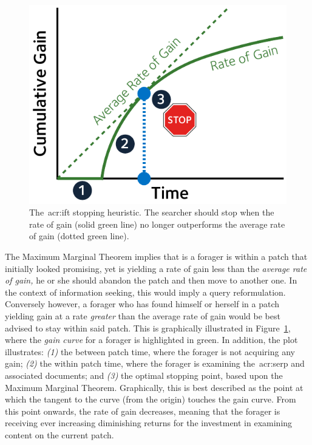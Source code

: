 \begin{figure}
    \begin{center}
    \vspace*{-10mm}
    \includegraphics[width=1\textwidth]{figures/ch3-ift_stop.pdf}
    \end{center}
    \vspace*{-4mm}
    \caption[\gls{acr:ift} Stopping Heuristic]{The~\gls{acr:ift} stopping heuristic. The searcher should stop when the rate of gain (solid {\color{dmax_green}green} line) no longer outperforms the average rate of gain (dotted {\color{dmax_green}green} line).}
    \label{fig:ift_stopping}
\end{figure}

The Maximum Marginal Theorem implies that is a forager is within a patch that initially looked promising, yet is yielding a rate of gain less than the \emph{average rate of gain,} he or she should abandon the patch and then move to another one. In the context of information seeking, this would imply a query reformulation. Conversely however, a forager who has found himself or herself in a patch yielding gain at a rate \emph{greater} than the average rate of gain would be best advised to stay within said patch. This is graphically illustrated in Figure~\ref{fig:ift_stopping}, where the \emph{gain curve} for a forager is highlighted in {\color{dmax_green}green.} In addition, the plot illustrates: \emph{(1)} the between patch time, where the forager is not acquiring any gain; \emph{(2)} the within patch time, where the forager is examining the~\gls{acr:serp} and associated documents; and \emph{(3)} the optimal stopping point, based upon the Maximum Marginal Theorem. Graphically, this is best described as the point at which the tangent to the curve (from the origin) touches the gain curve. From this point onwards, the rate of gain decreases, meaning that the forager is receiving ever increasing diminishing returns for the investment in examining content on the current patch.

